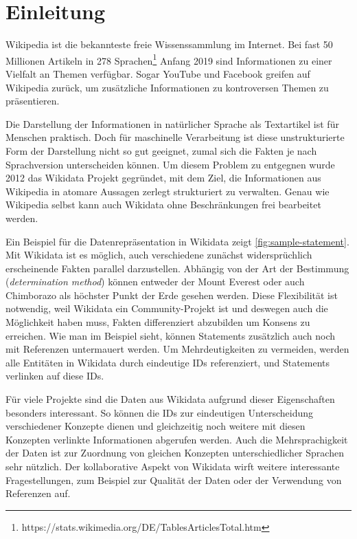 %
\chapter{Einleitung}
\label{sec:intro}
Wikipedia ist die bekannteste freie Wissenssammlung im Internet.
Bei fast 50 Millionen Artikeln in 278 Sprachen\footnote{https://stats.wikimedia.org/DE/TablesArticlesTotal.htm} Anfang 2019 sind Informationen zu einer Vielfalt an Themen verfügbar.
Sogar YouTube und Facebook greifen auf Wikipedia zurück, um zusätzliche Informationen zu kontroversen Themen zu präsentieren.\cite{youtube-facebook-wp}


Die Darstellung der Informationen in natürlicher Sprache als Textartikel ist für Menschen praktisch.
Doch für maschinelle Verarbeitung ist diese unstrukturierte Form der Darstellung nicht so gut geeignet, zumal sich die Fakten je nach Sprachversion unterscheiden können.
Um diesem Problem zu entgegnen wurde 2012 das Wikidata Projekt gegründet, mit dem Ziel, die Informationen aus Wikipedia in atomare Aussagen zerlegt strukturiert zu verwalten\cite{wikidata}.
Genau wie Wikipedia selbst kann auch Wikidata ohne Beschränkungen frei bearbeitet werden.

Ein Beispiel für die Datenrepräsentation in Wikidata zeigt \cref{fig:sample-statement}.
Mit Wikidata ist es möglich, auch verschiedene zunächst widersprüchlich erscheinende Fakten parallel darzustellen.
Abhängig von der Art der Bestimmung (\emph{determination method}) können entweder der Mount Everest oder auch Chimborazo als höchster Punkt der Erde gesehen werden.
Diese Flexibilität ist notwendig, weil Wikidata ein Community-Projekt ist und deswegen auch die Möglichkeit haben muss, Fakten differenziert abzubilden um Konsens zu erreichen.
Wie man im Beispiel sieht, können Statements zusätzlich auch noch mit Referenzen untermauert werden.
Um Mehrdeutigkeiten zu vermeiden, werden alle Entitäten in Wikidata durch eindeutige IDs referenziert, und Statements verlinken auf diese IDs.

Für viele Projekte sind die Daten aus Wikidata aufgrund dieser Eigenschaften besonders interessant.
So können die IDs zur eindeutigen Unterscheidung verschiedener Konzepte dienen und gleichzeitig noch weitere mit diesen Konzepten verlinkte Informationen abgerufen werden.
Auch die Mehrsprachigkeit der Daten ist zur Zuordnung von gleichen Konzepten unterschiedlicher Sprachen sehr nützlich.
Der kollaborative Aspekt von Wikidata wirft weitere interessante Fragestellungen, zum Beispiel zur Qualität der Daten\cite{wd-taxonomic-hierarchies} oder der Verwendung von Referenzen\cite{wd-wk-common-references}\cite{wd-provenance-information} auf.

